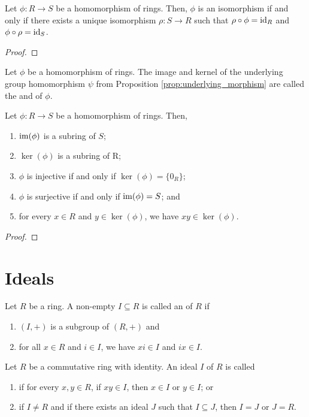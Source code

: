 \begin{prop}
Let $ \phi:R\to S $ be a homomorphism of rings. Then, $ \phi $ is an isomorphism if and only if there exists a unique isomorphism $ \rho:S\to R $ such that $ \rho\circ\phi=\operatorname{id}_R $ and $ \phi\circ\rho=\operatorname{id}_S $.
\end{prop}
\begin{proof}
\end{proof}

\begin{defn}
Let $ \phi $ be a homomorphism of rings. The image and kernel of the underlying group homomorphism $ \psi $ from Proposition \ref{prop:underlying_morphism} are called the  and  of $ \phi $.
\end{defn}

\begin{prop}
Let $ \phi:R\to S $ be a homomorphism of rings. Then,
\begin{enumerate}
    \item $ \operatorname{im}(\phi) $ is a subring of $ S $;
    \item $ \ker(\phi) $ is a subring of R;
    \item $ \phi $ is injective if and only if $ \ker(\phi)=\{0_R\} $;
    \item $ \phi $ is surjective if and only if $ \operatorname{im}(\phi)=S $; and
    \item for every $ x\in R $ and $ y\in\ker(\phi) $, we have $ xy\in\ker(\phi) $.
\end{enumerate}
\end{prop}
\begin{proof}
\end{proof}

\section{Ideals}

\begin{defn}
Let $ R $ be a ring. A non-empty $ I\subseteq R $ is called an  of $ R $ if
\begin{enumerate}
    \item $ (I,+) $ is a subgroup of $ (R,+) $ and
    \item for all $ x\in R $ and $ i\in I $, we have $ xi\in I $ and $ ix\in I $.
\end{enumerate}
\end{defn}

\begin{defn}
Let $ R $ be a commutative ring with identity. An ideal $ I $ of $ R $ is called
\begin{enumerate}
    \item {} if for every $ x,y\in R $, if $ xy\in I $, then $ x\in I $ or $ y\in I $; or
    \item {} if $ I\neq R $ and if there exists an ideal $ J $ such that $ I\subseteq J $, then $ I=J $ or $ J=R $.
\end{enumerate}
\end{defn}

